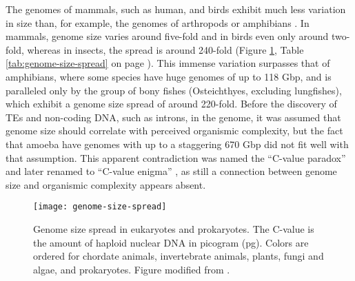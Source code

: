The genomes of mammals, such as human, and birds exhibit much less
variation in size than, for example, the genomes of arthropods or
amphibians \citep{Gregory2005}. In mammals, genome size varies around
five-fold and in birds even only around two-fold, whereas in insects,
the spread is around 240-fold (Figure \ref{fig:genome-size-spread},
Table \ref{tab:genome-size-spread} on page
\pageref{tab:genome-size-spread}). This immense variation surpasses that
of amphibians, where some species have huge genomes of up to 118 Gbp,
and is paralleled only by the group of bony fishes (Osteichthyes,
excluding lungfishes), which exhibit a genome size spread of around
220-fold. Before the discovery of TEs and non-coding DNA, such as
introns, in the genome, it was assumed that genome size should correlate
with perceived organismic complexity, but the fact that amoeba have
genomes with up to a staggering 670 Gbp \citep{Parfrey2008} did not fit
well with that assumption. This apparent contradiction was named the
``C-value paradox'' and later renamed to ``C-value enigma''
\citep{Gregory2007}, as still a connection between genome size and
organismic complexity appears absent.

\begin{figure}
\centering
\texttt{[image: genome-size-spread]}
\caption[Genome size spread in eukaryotes and prokaryotes]{Genome size
spread in eukaryotes and prokaryotes. The C-value is the amount of
haploid nuclear DNA in picogram (pg). Colors are ordered for chordate
animals, invertebrate animals, plants, fungi and algae, and prokaryotes.
Figure modified from \citet{Gregory2004}.}
\label{fig:genome-size-spread}
\end{figure}

